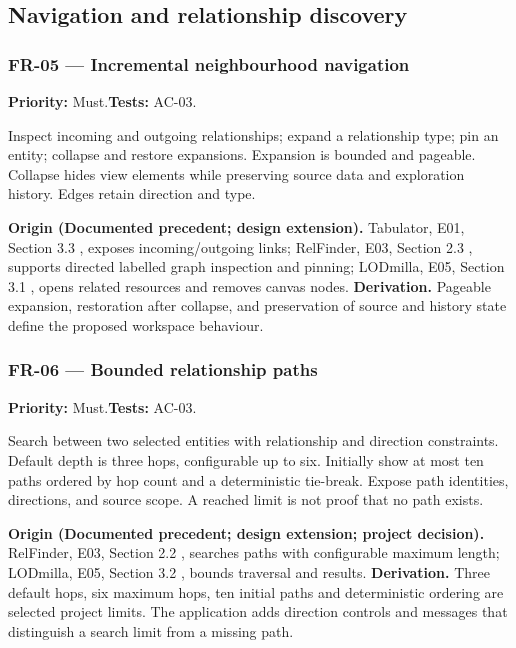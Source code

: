 \documentclass[11pt,a4paper]{article}
\newcommand{\req}[4]{\subsubsection*{#1 --- #2}\phantomsection\label{req:#1}\textbf{Priority:} #3.\quad\textbf{Tests:} #4.\par}
\newcommand{\origin}[3]{\par{\small\textbf{Origin (#1).} #2 \textbf{Derivation.} #3\par}}
\begin{document}
\subsection{Navigation and relationship discovery}
\par\noindent\begin{minipage}{\linewidth}
\req{FR-05}{Incremental neighbourhood navigation}{Must}{AC-03}
Inspect incoming and outgoing relationships; expand a relationship type; pin an entity; collapse and restore expansions. Expansion is bounded and pageable. Collapse hides view elements while preserving source data and exploration history. Edges retain direction and type.
\origin{Documented precedent; design extension}{Tabulator, E01, Section 3.3 \citep{tabulator}, exposes incoming/outgoing links; RelFinder, E03, Section 2.3 \citep{relfinder}, supports directed labelled graph inspection and pinning; LODmilla, E05, Section 3.1 \citep{lodmilla}, opens related resources and removes canvas nodes.}{Pageable expansion, restoration after collapse, and preservation of source and history state define the proposed workspace behaviour.}
\end{minipage}\par
\par\noindent\begin{minipage}{\linewidth}
\req{FR-06}{Bounded relationship paths}{Must}{AC-03}
Search between two selected entities with relationship and direction constraints. Default depth is three hops, configurable up to six. Initially show at most ten paths ordered by hop count and a deterministic tie-break. Expose path identities, directions, and source scope. A reached limit is not proof that no path exists.
\origin{Documented precedent; design extension; project decision}{RelFinder, E03, Section 2.2 \citep{relfinder}, searches paths with configurable maximum length; LODmilla, E05, Section 3.2 \citep{lodmilla}, bounds traversal and results.}{Three default hops, six maximum hops, ten initial paths and deterministic ordering are selected project limits. The application adds direction controls and messages that distinguish a search limit from a missing path.}
\end{minipage}\par
\end{document}
